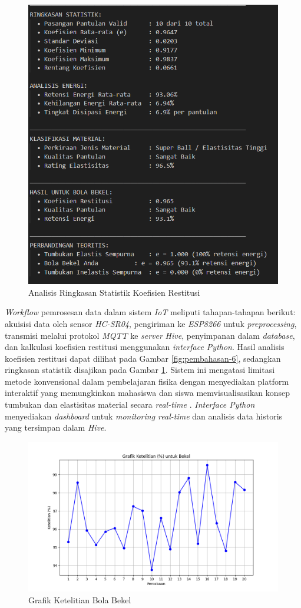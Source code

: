 \begin{figure}[!htbp]
    \centering
    \includegraphics[width=0.9\linewidth]{images/Analisis-Ringkasan-Statistik.png}
    \caption{Analisis Ringkasan Statistik Koefisien Restitusi}
    \label{fig:pembahasan-7}
\end{figure}
\newpage
\textit{Workflow} pemrosesan data dalam sistem \textit{IoT} meliputi tahapan-tahapan berikut: akuisisi data oleh sensor \textit{HC-SR04}, pengiriman ke \textit{ESP8266} untuk \textit{preprocessing}, transmisi melalui protokol \textit{MQTT} ke \textit{server} \textit{Hive}, penyimpanan dalam \textit{database}, dan kalkulasi koefisien restitusi menggunakan \textit{interface Python}. Hasil analisis koefisien restitusi dapat dilihat pada Gambar \ref{fig:pembahasan-6}, sedangkan ringkasan statistik disajikan pada Gambar \ref{fig:pembahasan-7}. Sistem ini mengatasi limitasi metode konvensional dalam pembelajaran fisika dengan menyediakan platform interaktif yang memungkinkan mahasiswa dan siswa memvisualisasikan konsep tumbukan dan elastisitas material secara \textit{real-time} \citep{anderson2019digital}. \textit{Interface Python} menyediakan \textit{dashboard} untuk \textit{monitoring real-time} dan analisis data historis yang tersimpan dalam \textit{Hive}.


\begin{figure}[!htbp]
    \centering
    \includegraphics[width=0.5\linewidth]{output_tex/Grafik_ketelitian_Bekel.png}
    \caption{Grafik Ketelitian Bola Bekel}
    \label{fig:grafik-bola-bekel}
\end{figure}
\newpage


